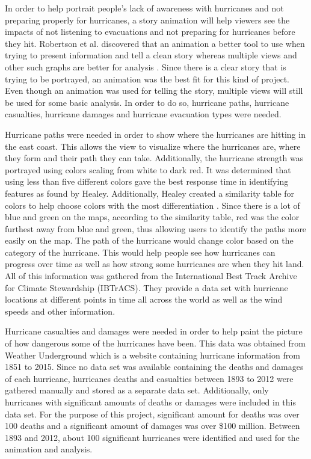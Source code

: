 In order to help portrait people's lack of awareness with hurricanes and not preparing properly for hurricanes, a story animation will help viewers see the impacts of not listening to evacuations and not preparing for hurricanes before they hit. Robertson et al. discovered that an animation a better tool to use when trying to present information and tell a clean story whereas multiple views and other such graphs are better for analysis \cite{robertson2008effectiveness}. Since there is a clear story that is trying to be portrayed, an animation was the best fit for this kind of project. Even though an animation was used for telling the story, multiple views will still be used for some basic analysis. In order to do so, hurricane paths, hurricane casualties, hurricane damages and hurricane evacuation types were needed. 

Hurricane paths were needed in order to show where the hurricanes are hitting in the east coast. This allows the view to visualize where the hurricanes are, where they form and their path they can take. Additionally, the hurricane strength was portrayed using colors scaling from white to dark red. It was determined that using less than five different colors gave the best response time in identifying features as found by Healey. Additionally, Healey created a similarity table for colors to help choose colors with the most differentiation \cite{healey1996choosing}. Since there is a lot of blue and green on the maps, according to the similarity table, red was the color furthest away from blue and green, thus allowing users to identify the paths more easily on the map. The path of the hurricane would change color based on the category of the hurricane. This would help people see how hurricanes can progress over time as well as how strong some hurricanes are when they hit land. All of this information was gathered from the International Best Track Archive for Climate Stewardship (IBTrACS). They provide a data set with hurricane locations at different points in time all across the world as well as the wind speeds and other information. 

Hurricane casualties and damages were needed in order to help paint the picture of how dangerous some of the hurricanes have been. This data was obtained from Weather Underground which is a website containing hurricane information from 1851 to 2015. Since no data set was available containing the deaths and damages of each hurricane, hurricanes deaths and casualties between 1893 to 2012 were gathered manually and stored as a separate data set. Additionally, only hurricanes with significant amounts of deaths or damages were included in this data set. For the purpose of this project, significant amount for deaths was over 100 deaths and a significant amount of damages was over \$100 million. Between 1893 and 2012, about 100 significant hurricanes were identified and used for the animation and analysis.

